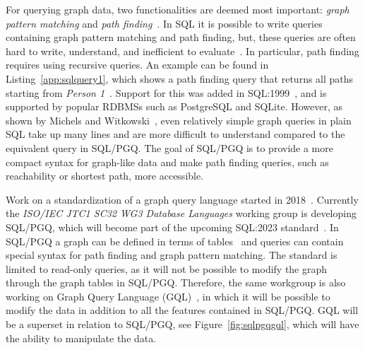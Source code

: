 For querying graph data, two functionalities are deemed most important: \textit{graph pattern matching} and \textit{path finding}~\cite{DBLP:journals/csur/AnglesABHRV17}.
In SQL it is possible to write queries containing graph pattern matching and path finding, but, these queries are often hard to write, understand, and inefficient to evaluate~\cite{graindb}. 
In particular, path finding requires using recursive queries. 
An example can be found in Listing~\ref{app:sqlquery1}, which shows a path finding query that returns all paths starting from \textit{Person 1}~\cite{DuckDBDocumentationWithClause}. 
Support for this was added in SQL:1999~\cite{Melton2002Sql1U}, and is supported by popular RDBMSs such as PostgreSQL and SQLite.
However, as shown by Michels and Witkowski~\cite{oracle-sql-example}, even relatively simple graph queries in plain SQL take up many lines and are more difficult to understand compared to the equivalent query in SQL/PGQ. 
The goal of SQL/PGQ is to provide a more compact syntax for graph-like data and make path finding queries, such as reachability or shortest path, more accessible.


Work on a standardization of a graph query language started in 2018~\cite{DBLP:conf/sigmod/AnglesABBFGLPPS18, Deutsch2021, gqlmanifesto}. 
Currently the \emph{ISO/IEC JTC1 SC32 WG3 Database Languages} working group is developing SQL/PGQ, which will become part of the upcoming SQL:2023 standard~\cite{isosqlpgq}. 
In SQL/PGQ a graph can be defined in terms of tables~\cite{DBLP:conf/sigmod/MhedhbiLKWS21} and queries can contain special syntax for path finding and graph pattern matching.
The standard is limited to read-only queries, as it will not be possible to modify the graph through the graph tables in SQL/PGQ. 
Therefore, the same workgroup is also working on Graph Query Language (GQL)~\cite{isogql}, in which it will be possible to modify the data in addition to all the features contained in SQL/PGQ.
GQL will be a superset in relation to SQL/PGQ, see Figure~\ref{fig:sqlpgqgql}, which will have the ability to manipulate the data.

